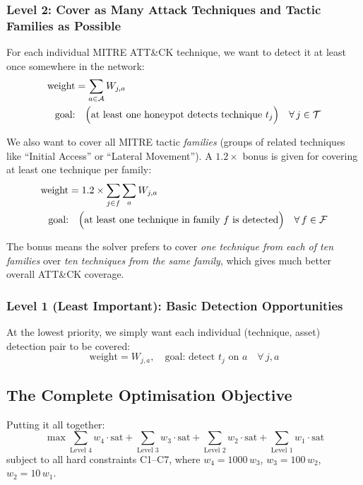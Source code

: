 \documentclass[journal]{IEEEtran}
\newcommand{\calT}{\mathcal{T}}
\newcommand{\calA}{\mathcal{A}}
\begin{document}
\subsubsection{Level 2: Cover as Many Attack Techniques and Tactic Families as Possible}

For each individual MITRE ATT\&CK technique, we want to detect it
at least once somewhere in the network:
\begin{align}
  \text{weight} &= \sum_{a \in \calA} W_{j,a} \notag \\
  \text{goal:} &\quad
    \Bigl(\text{at least one honeypot detects technique } t_j\Bigr)
    \quad \forall\, j \in \calT
  \label{eq:tier2-tech}
\end{align}

We also want to cover all MITRE tactic \emph{families} (groups of
related techniques like ``Initial Access'' or ``Lateral Movement'').
A $1.2\times$ bonus is given for covering at least one technique
per family:
\begin{align}
  \text{weight} &= 1.2 \times \sum_{j \in f} \sum_{a} W_{j,a}
  \notag \\
  \text{goal:} &\quad
    \Bigl(\text{at least one technique in family } f \text{ is detected}\Bigr)
    \quad \forall\, f \in \mathcal{F}
  \label{eq:tier2-fam}
\end{align}

The bonus means the solver prefers to cover \emph{one technique
from each of ten families} over \emph{ten techniques from the same
family}, which gives much better overall ATT\&CK coverage.

\subsubsection{Level 1 (Least Important): Basic Detection Opportunities}
At the lowest priority, we simply want each individual
(technique, asset) detection pair to be covered:
\begin{equation}
  \text{weight} = W_{j,a},
  \quad \text{goal: detect } t_j \text{ on } a
  \quad \forall\, j, a
\end{equation}

\subsection{The Complete Optimisation Objective}

Putting it all together:
\begin{equation}
\max \sum_{\text{Level 4}} w_4 \cdot \text{sat}
   + \sum_{\text{Level 3}} w_3 \cdot \text{sat}
   + \sum_{\text{Level 2}} w_2 \cdot \text{sat}
   + \sum_{\text{Level 1}} w_1 \cdot \text{sat}
\end{equation}
subject to all hard constraints C1--C7, where
$w_4 = 1000\,w_3$, $w_3 = 100\,w_2$, $w_2 = 10\,w_1$.
\end{document}
